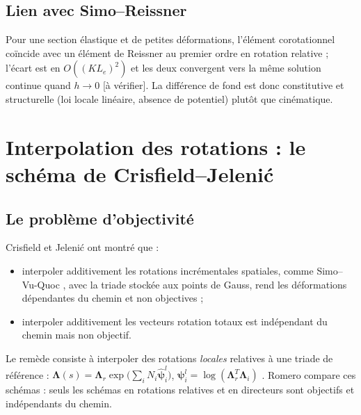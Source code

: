 \documentclass[11pt,a4paper]{article}
\newcommand{\hatv}[1]{\widehat{\bm{#1}}}
\newcommand{\Lam}{\bm{\Lambda}}
\newcommand{\averif}{\textcolor{orange!80!black}{[à vérifier]}}
\begin{document}
\subsection{Lien avec Simo--Reissner}
Pour une section élastique et de petites déformations, l'élément corotationnel
coïncide avec un élément de Reissner au premier ordre en rotation relative ;
l'écart est en $O((KL_e)^2)$ et les deux convergent vers la même solution
continue quand $h\to0$ \cite{crisfield1997,battini2002} \averif. La différence de
fond est donc constitutive et structurelle (loi locale linéaire, absence de
potentiel) plutôt que cinématique.

\section{Interpolation des rotations : le schéma de Crisfield--Jelenić}

\subsection{Le problème d'objectivité}
Crisfield et Jelenić \cite{crisfield1999} ont montré que :
\begin{itemize}
\item interpoler additivement les rotations incrémentales spatiales, comme
Simo--Vu-Quoc \cite{simovuquoc1986}, avec la triade stockée aux points de Gauss,
rend les déformations dépendantes du chemin et non objectives ;
\item interpoler additivement les vecteurs rotation totaux
\cite{ibrahimbegovic1995,cardona1988} est indépendant du chemin mais non
objectif.
\end{itemize}
Le remède consiste à interpoler des rotations \emph{locales} relatives à une
triade de référence :
$\Lam(s)=\Lam_r\exp\big(\sum_iN_i\hatv\psi^l_i\big)$,
$\bm\psi^l_i=\log(\Lam_r^T\Lam_i)$ \cite{crisfield1999,jelenic1999}. Romero
\cite{romero2004} compare ces schémas : seuls les schémas en rotations relatives
et en directeurs \cite{romero2002,betsch2002} sont objectifs et indépendants du
chemin.
\end{document}
